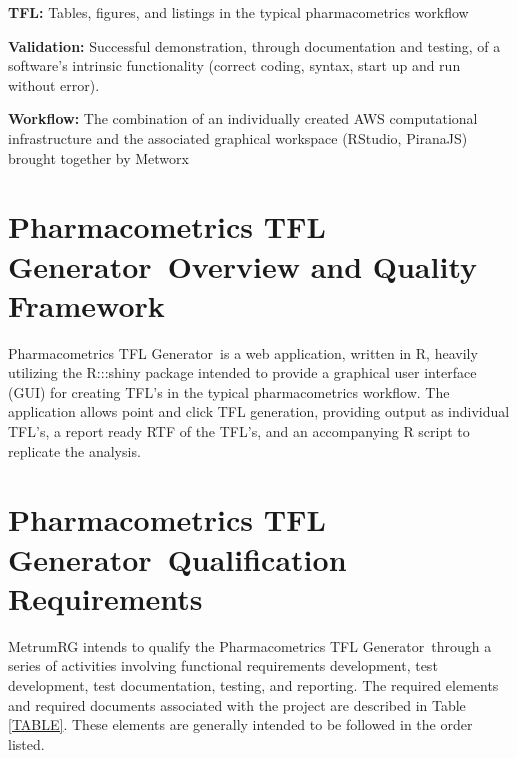 \documentclass{article}
\newcommand{\tfl}{Pharmacometrics TFL Generator}
\begin{document}
{\bf TFL:} Tables, figures, and listings in the typical pharmacometrics workflow

{\bf Validation:} Successful demonstration, through documentation and testing, of a software's intrinsic functionality (correct coding, syntax, start up and run without error).

{\bf Workflow:} The combination of an individually created AWS computational infrastructure and the associated graphical workspace (RStudio, PiranaJS) brought together by Metworx

\newpage

\section*{\tfl\ Overview and Quality Framework}

\tfl\ is a web application, written in R, heavily utilizing the R:::shiny package intended to provide a graphical user interface (GUI) for creating TFL's in the typical pharmacometrics workflow.  The application allows point and click TFL generation, providing output as individual TFL's, a report ready RTF of the TFL's, and an accompanying R script to replicate the analysis.

\section*{\tfl\ Qualification Requirements}

MetrumRG intends to qualify the \tfl\ through a series of activities involving functional requirements development, test development, test documentation, testing, and reporting. The required elements and required documents associated with the project are described in Table \ref{TABLE}. These elements are generally intended to be followed in the order listed. 
\end{document}
